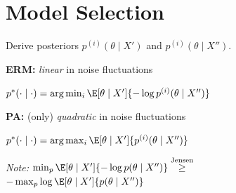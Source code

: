 \section{Model Selection}

Derive posteriors $p^{(i)} (\theta \mid X')$ and $p^{(i)} (\theta \mid X'')$.


\textbf{ERM:}\enskip
\textit{linear} in noise fluctuations

\quad $p^\ast (\cdot\mid\cdot) = \arg\min_i \E[\theta\mid X']{-\log p^{(i)} (\theta\mid X'')}$


\textbf{PA:}\enskip
(only) \textit{quadratic} in noise fluctuations

\quad $p^\ast (\cdot\mid\cdot) = \arg\max_i \E[\theta\mid X']{p^{(i)} (\theta\mid X'')}$


\textit{Note:}\enskip
$\min_p \E[\theta\mid X']{-\log p(\theta\mid X'')} \overset{\small \text{Jensen}}{\geq}$
\\\qquad $- \max_p \log \E[\theta\mid X']{p(\theta\mid X'')}$


